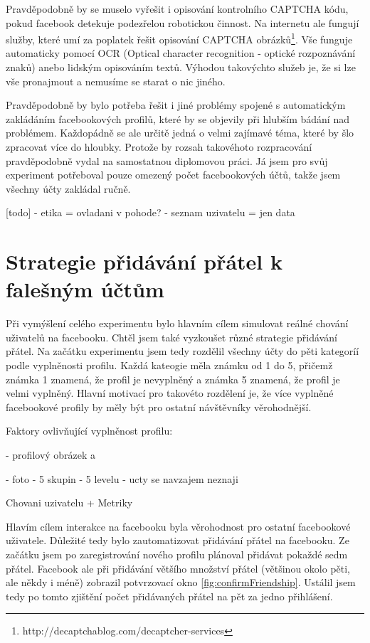 \documentclass[thesis=M,czech]{FITthesis}[2013/05/10]
\begin{document}
Pravděpodobně by se muselo vyřešit i opisování kontrolního CAPTCHA kódu, pokud facebook detekuje podezřelou robotickou činnost. Na internetu ale fungují služby, které umí za poplatek řešit opisování CAPTCHA obrázků\footnote{http://decaptchablog.com/decaptcher-services}. Vše funguje automaticky pomocí OCR (Optical character recognition - optické rozpoznávání znaků) anebo lidským opisováním textů. Výhodou takovýchto služeb je, že si lze vše pronajmout a nemusíme se starat o nic jiného.

Pravděpodobně by bylo potřeba řešit i jiné problémy spojené s automatickým zakládáním facebookových profilů, které by se objevily při hlubším bádání nad problémem. Každopádně se ale určitě jedná o velmi zajímavé téma, které by šlo zpracovat více do hloubky. Protože by rozsah takovéhoto rozpracování pravděpodobně vydal na samostatnou diplomovou práci. Já jsem pro svůj experiment potřeboval pouze omezený počet facebookových účtů, takže jsem všechny účty zakládal ručně.

[todo]
- etika = ovladani v pohode?
- seznam uzivatelu = jen data

\section{Strategie přidávání přátel k falešným účtům}

Při vymýšlení celého experimentu bylo hlavním cílem simulovat reálné chování uživatelů na facebooku. Chtěl jsem také vyzkoušet různé strategie přidávání přátel. Na začátku experimentu jsem tedy rozdělil všechny účty do pěti kategoríí podle vyplněnosti profilu. Každá kateogie měla známku od 1 do 5, přičemž známka 1 znamená, že profil je nevyplněný a známka 5 znamená, že profil je velmi vyplněný. Hlavní motivací pro takovéto rozdělení je, že více vyplněné facebookové profily by měly být pro ostatní návštěvníky věrohodnější.

Faktory ovlivňující vyplněnost profilu:

- profilový obrázek a  

- foto
- 5 skupin
- 5 levelu
- ucty se navzajem neznaji

Chovani uzivatelu + Metriky


Hlavím cílem interakce na facebooku byla věrohodnost pro ostatní facebookové uživatele. Důležité tedy bylo zautomatizovat přidávání přátel na facebooku. Ze začátku jsem po zaregistrování nového profilu plánoval přidávat pokaždé sedm přátel. Facebook ale při přidávání většího množství přátel (většinou okolo pěti, ale někdy i méně) zobrazil potvrzovací okno \ref{fig:confirmFriendship}. Ustálil jsem tedy po tomto zjištění počet přidávaných přátel na pět za jedno přihlášení. 
\end{document}
